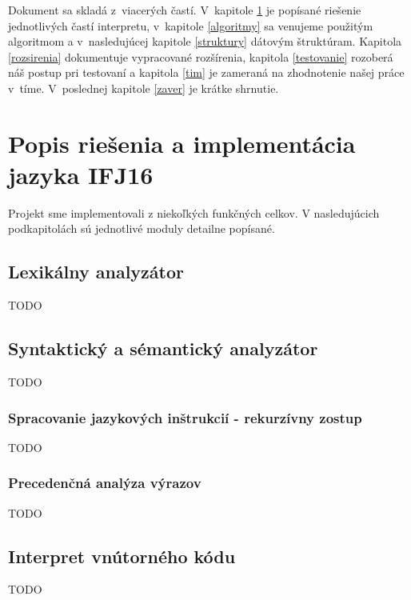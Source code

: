 \documentclass[11pt,a4paper]{article}
\begin{document}
Dokument sa skladá z~viacerých častí. V~kapitole \ref{popis} je popísané riešenie jednotlivých častí interpretu, v~kapitole \ref{algoritmy} sa venujeme použitým algoritmom a v~nasledujúcej kapitole \ref{struktury} dátovým štruktúram. Kapitola \ref{rozsirenia} dokumentuje vypracované rozšírenia, kapitola \ref{testovanie} rozoberá náš postup pri testovaní a kapitola \ref{tim} je zameraná na zhodnotenie našej práce v~tíme. V~poslednej kapitole \ref{zaver} je krátke shrnutie.

\section{Popis riešenia a implementácia jazyka IFJ16} 
\label{popis}

Projekt sme implementovali z niekoľkých funkčných celkov. V nasledujúcich podkapitolách sú jednotlivé moduly detailne popísané.

    \subsection{Lexikálny analyzátor}
    \label{lexer}

    TODO

    \subsection{Syntaktický a sémantický analyzátor}
    \label{parser}

    TODO

        \subsubsection{Spracovanie jazykových inštrukcií - rekurzívny zostup}
        \label{rekurzia}
    
        TODO
    
        \subsubsection{Precedenčná analýza výrazov}
        \label{precedencna analyza}
    
    TODO
    
    \subsection{Interpret vnútorného kódu}
    \label{interpret}
    
    TODO
\end{document}
